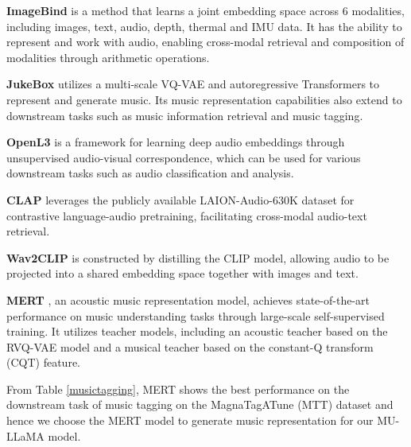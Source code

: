 \documentclass{article}
\begin{document}
\begingroup
\renewcommand\labelenumi{ \textbf{\theenumi)}}
\begin{enumerate*}
    \item \textbf{ImageBind} \cite{girdhar2023imagebind} is a method that learns a joint embedding space across 6 modalities, including images, text, audio, depth, thermal and IMU data. It has the ability to represent and work with audio, enabling cross-modal retrieval and composition of modalities through arithmetic operations.

    \item \textbf{JukeBox} \cite{castellon2021codified} utilizes a multi-scale VQ-VAE and autoregressive Transformers to represent and generate music. Its music representation capabilities also extend to downstream tasks such as music information retrieval and music tagging.

    \item \textbf{OpenL3} \cite{8682475} is a framework for learning deep audio embeddings through unsupervised audio-visual correspondence, which can be used for various downstream tasks such as audio classification and analysis.

    \item \textbf{CLAP} \cite{wu2023largescale} leverages the publicly available LAION-Audio-630K dataset \cite{wu2023largescale} for contrastive language-audio pretraining, facilitating cross-modal audio-text retrieval.

    \item \textbf{Wav2CLIP} \cite{wu2022wav2clip} is constructed by distilling the CLIP \cite{radford2021learning} model, allowing audio to be projected into a shared embedding space together with images and text.

    \item \textbf{MERT} \cite{li2023mert}, an acoustic music representation model, achieves state-of-the-art performance on music understanding tasks through large-scale self-supervised training. It utilizes teacher models, including an acoustic teacher based on the RVQ-VAE model \cite{lai2022robust} and a musical teacher based on the constant-Q transform (CQT) \cite{Schrkhuber2010CONSTANTQTT} feature.
\end{enumerate*}
\endgroup

From Table \ref{musictagging}, MERT shows the best performance on the downstream task of music tagging on the MagnaTagATune (MTT) \cite{9aed49b956a24e99b044582665fd5b21} dataset and hence we choose the MERT model to generate music representation for our MU-LLaMA model.
\end{document}
